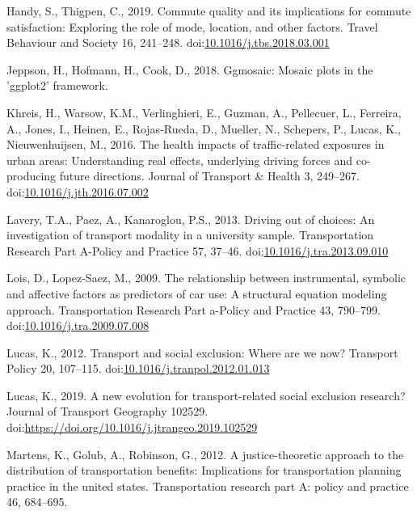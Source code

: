 \documentclass[]{elsarticle} %
\begin{document}
\leavevmode\hypertarget{ref-Handy2019commute}{}%
Handy, S., Thigpen, C., 2019. Commute quality and its implications for
commute satisfaction: Exploring the role of mode, location, and other
factors. Travel Behaviour and Society 16, 241--248.
doi:\href{https://doi.org/10.1016/j.tbs.2018.03.001}{10.1016/j.tbs.2018.03.001}

\leavevmode\hypertarget{ref-Jeppson2019ggmosaic}{}%
Jeppson, H., Hofmann, H., Cook, D., 2018. Ggmosaic: Mosaic plots in the
'ggplot2' framework.

\leavevmode\hypertarget{ref-Khreis2016health}{}%
Khreis, H., Warsow, K.M., Verlinghieri, E., Guzman, A., Pellecuer, L.,
Ferreira, A., Jones, I., Heinen, E., Rojas-Rueda, D., Mueller, N.,
Schepers, P., Lucas, K., Nieuwenhuijsen, M., 2016. The health impacts of
traffic-related exposures in urban areas: Understanding real effects,
underlying driving forces and co-producing future directions. Journal of
Transport \& Health 3, 249--267.
doi:\href{https://doi.org/10.1016/j.jth.2016.07.002}{10.1016/j.jth.2016.07.002}

\leavevmode\hypertarget{ref-Lavery2013driving}{}%
Lavery, T.A., Paez, A., Kanaroglou, P.S., 2013. Driving out of choices:
An investigation of transport modality in a university sample.
Transportation Research Part A-Policy and Practice 57, 37--46.
doi:\href{https://doi.org/10.1016/j.tra.2013.09.010}{10.1016/j.tra.2013.09.010}

\leavevmode\hypertarget{ref-Lois2009relationship}{}%
Lois, D., Lopez-Saez, M., 2009. The relationship between instrumental,
symbolic and affective factors as predictors of car use: A structural
equation modeling approach. Transportation Research Part a-Policy and
Practice 43, 790--799.
doi:\href{https://doi.org/10.1016/j.tra.2009.07.008}{10.1016/j.tra.2009.07.008}

\leavevmode\hypertarget{ref-Lucas2012transport}{}%
Lucas, K., 2012. Transport and social exclusion: Where are we now?
Transport Policy 20, 107--115.
doi:\href{https://doi.org/10.1016/j.tranpol.2012.01.013}{10.1016/j.tranpol.2012.01.013}

\leavevmode\hypertarget{ref-Lucas2019evolution}{}%
Lucas, K., 2019. A new evolution for transport-related social exclusion
research? Journal of Transport Geography 102529.
doi:\href{https://doi.org/https://doi.org/10.1016/j.jtrangeo.2019.102529}{https://doi.org/10.1016/j.jtrangeo.2019.102529}

\leavevmode\hypertarget{ref-Martens2012justice}{}%
Martens, K., Golub, A., Robinson, G., 2012. A justice-theoretic approach
to the distribution of transportation benefits: Implications for
transportation planning practice in the united states. Transportation
research part A: policy and practice 46, 684--695.
\end{document}
